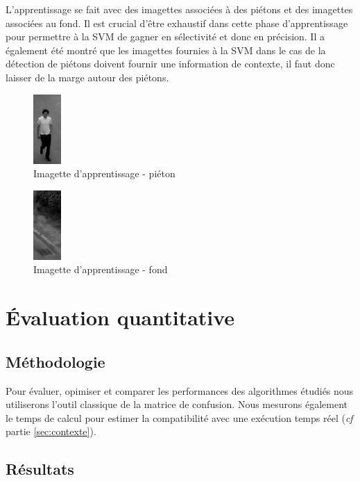 \documentclass{article}
\begin{document}
	L'apprentissage se fait avec des imagettes associées à des piétons et des imagettes associées au fond. Il est crucial d'être exhaustif dans cette phase d'apprentissage pour permettre à la SVM de gagner en sélectivité et donc en précision. Il a également été montré \cite{HOG} que les imagettes fournies à la SVM dans le cas de la détection de piétons doivent fournir une information de contexte, il faut donc laisser de la marge autour des piétons.
	
	\begin{figure}[h]
		\begin{center}			
			\includegraphics[scale=1]{Img/pieton_03}
		\end{center}
		\caption{Imagette d'apprentissage - piéton}
	\end{figure}
	
	
	\begin{figure}[h]
		\begin{center}			
			\includegraphics[scale=1]{Img/fond_01}
		\end{center}
		\caption{Imagette d'apprentissage - fond}
	\end{figure}

\section{\'{E}valuation quantitative}
\label{sec:evalquant}

	\subsection{Méthodologie}
	Pour évaluer, opimiser et comparer les performances des algorithmes étudiés nous utiliserons l'outil classique de la matrice de confusion. Nous mesurons également le temps de calcul pour estimer la compatibilité avec une exécution temps réel (\emph{cf} partie \ref{sec:contexte}).
	
	\subsection{Résultats}
	
\end{document}
